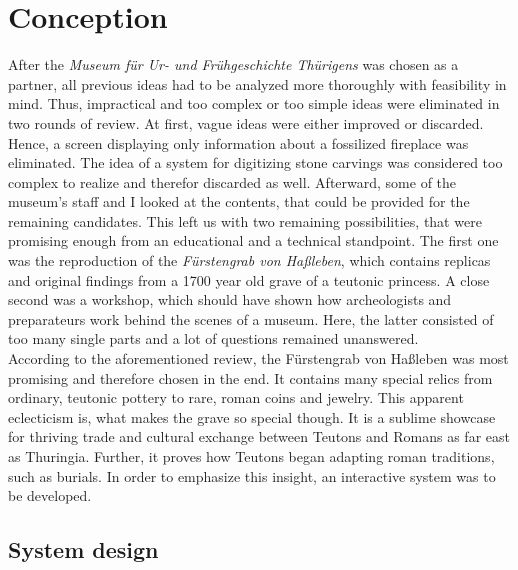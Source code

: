\chapter{Conception}
\label{conception}

After the \textit{Museum für Ur- und Frühgeschichte Thürigens} was chosen as a partner, all previous ideas had to be analyzed more thoroughly with feasibility in mind. Thus, impractical and too complex or too simple ideas were eliminated in two rounds of review. At first, vague ideas were either improved or discarded. Hence, a screen displaying only information about a fossilized fireplace was eliminated. The idea of a system for digitizing stone carvings was considered too complex to realize and therefor discarded as well. Afterward, some of the museum's staff and I looked at the contents, that could be provided for the remaining candidates. This left us with two remaining possibilities, that were promising enough from an educational and a technical standpoint. The first one was the reproduction of the \textit{Fürstengrab von Haßleben}, which contains replicas and original findings from a 1700 year old grave of a teutonic princess. A close second was a workshop, which should have shown how archeologists and preparateurs work behind the scenes of a museum. Here, the latter consisted of too many single parts and a lot of questions remained unanswered.
\\
According to the aforementioned review, the Fürstengrab von Haßleben was most promising and therefore chosen in the end. It contains many special relics from ordinary, teutonic pottery to rare, roman coins and jewelry. This apparent eclecticism is, what makes the grave so special though. It is a sublime showcase for thriving trade and cultural exchange between Teutons and Romans as far east as Thuringia. Further, it proves how Teutons began adapting roman traditions, such as burials. In order to emphasize this insight, an interactive system was to be developed.


\section{System design}
\label{conception_system}

